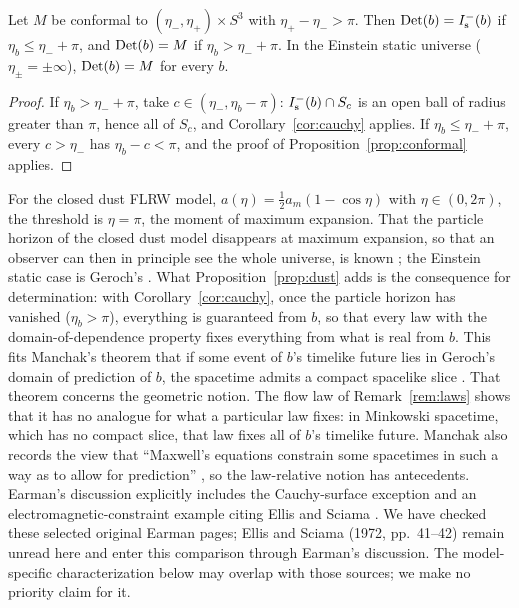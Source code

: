 \begin{proposition}\label{prop:dust}
Let $M$ be conformal to $(\eta_-,\eta_+)\times S^3$ with $\eta_+-\eta_->\pi$.
Then $\mathrm{Det}(b)=I^-_{\mathrm s}(b)$ if $\eta_b\le\eta_-+\pi$, and $\mathrm{Det}(b)=M$ if
$\eta_b>\eta_-+\pi$. In the Einstein static universe ($\eta_\pm=\pm\infty$),
$\mathrm{Det}(b)=M$ for every $b$.
\end{proposition}

\begin{proof}
If $\eta_b>\eta_-+\pi$, take $c\in(\eta_-,\eta_b-\pi)$: $I^-_{\mathrm s}(b)\cap S_c$ is an open
ball of radius greater than $\pi$, hence all of $S_c$, and
Corollary~\ref{cor:cauchy} applies. If $\eta_b\le\eta_-+\pi$, every $c>\eta_-$
has $\eta_b-c<\pi$, and the proof of Proposition~\ref{prop:conformal} applies.
\end{proof}

For the closed dust FLRW model, $a(\eta)=\tfrac12a_m(1-\cos\eta)$ with
$\eta\in(0,2\pi)$, the threshold is $\eta=\pi$, the moment of maximum
expansion. That the particle horizon of the closed dust model disappears at
maximum expansion, so that an observer can then in principle see the whole
universe, is known \citep{GronJohannesen2011,BolotinTanatarov2013}; the
Einstein static case is Geroch's \citep[Fig.~5]{Geroch1977}. What
Proposition~\ref{prop:dust} adds is the consequence for determination: with
Corollary~\ref{cor:cauchy}, once the particle horizon has vanished
($\eta_b>\pi$), everything is guaranteed from $b$, so that every law with the
domain-of-dependence property fixes everything from what is real from $b$.
This fits Manchak's theorem that if some event of $b$'s timelike future lies
in Geroch's domain of prediction of $b$, the spacetime admits a compact
spacelike slice \citep[p.~319]{Manchak2008}. That theorem concerns the
geometric notion. The flow law of Remark~\ref{rem:laws} shows that it has no
analogue for what a particular law fixes: in Minkowski spacetime, which has no
compact slice, that law fixes all of $b$'s timelike future. Manchak also
records the view that ``Maxwell's equations constrain some spacetimes in such
a way as to allow for prediction'' \citep[p.~321 and n.~15]{Manchak2008}, so
the law-relative notion has antecedents. Earman's discussion explicitly
includes the Cauchy-surface exception and an electromagnetic-constraint
example citing Ellis and Sciama \citep[pp.~125--130]{Earman1995}. We have checked
these selected original Earman pages; Ellis and Sciama (1972, pp.~41--42)
remain unread here and enter this comparison through Earman's discussion.
The model-specific characterization below may overlap with those sources;
we make no priority claim for it.

